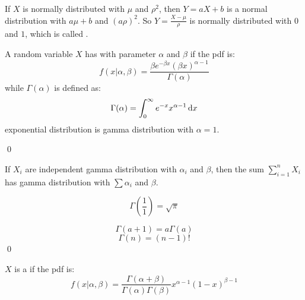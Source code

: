 \begin{theorem}
    If $X$ is normally distributed with $\mu$ and $\rho^2$, then $Y = aX + b$ is a normal distribution with $a\mu + b$ and $(a\rho)^2$. So $Y =\displaystyle \frac{X - \mu}{\rho}$ is normally distributed with $0$ and $1$, which is called .
\end{theorem}

\begin{definition}
    A random variable $X$ has  with parameter $\alpha$ and $\beta$ if the pdf is:
    \begin{equation*}
        f(x|\alpha, \beta) = \frac{\beta e^{-\beta x} (\beta x)^{\alpha - 1}}{\Gamma(\alpha)}
    \end{equation*}
    while $\Gamma(\alpha)$  is defined as:
    \begin{equation}
        \Gamma(\alpha) = \int_0^\infty e^{-x} x^{\alpha - 1} \dif{x}
    \end{equation}
    exponential distribution is gamma distribution with $\alpha = 1$.
    
    \qed
\end{definition}

\begin{theorem}
    If $X_i$ are independent gamma distribution with $\alpha_i$ and $\beta$, then the sum $\displaystyle \sum_{i=1}^n X_i$ has gamma distribution with $\displaystyle \sum \alpha_i$ and $\beta$.
\end{theorem}


\begin{theorem}
    \begin{equation}
        \Gamma \left(\frac{1}{1} \right) = \sqrt{\pi}
    \end{equation}
    
    \begin{equation}
        \Gamma (a + 1) = a \Gamma(a)
    \end{equation}
    \begin{equation}
        \Gamma (n) = (n-1)!
    \end{equation}
    \qed
\end{theorem}


\begin{definition}
    $X$ is a  if the pdf is:
    \begin{equation}
        f(x|\alpha, \beta) = \frac{\Gamma(\alpha + \beta)}{\Gamma(\alpha) \Gamma(\beta)} x^{\alpha - 1} (1-x)^{\beta - 1}
    \end{equation}
\end{definition}




